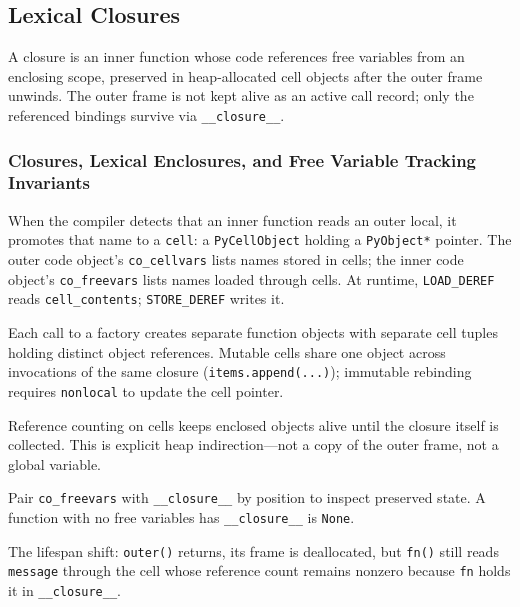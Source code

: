 \subsection{Lexical Closures}

A closure is an inner function whose code references free variables from an enclosing scope, preserved in heap-allocated cell objects after the outer frame unwinds. The outer frame is not kept alive as an active call record; only the referenced bindings survive via \texttt{\_\_closure\_\_}.

\subsubsection{Closures, Lexical Enclosures, and Free Variable Tracking Invariants}

When the compiler detects that an inner function reads an outer local, it promotes that name to a \texttt{cell}: a \texttt{PyCellObject} holding a \texttt{PyObject*} pointer. The outer code object's \texttt{co\_cellvars} lists names stored in cells; the inner code object's \texttt{co\_freevars} lists names loaded through cells. At runtime, \texttt{LOAD\_DEREF} reads \texttt{cell\_contents}; \texttt{STORE\_DEREF} writes it.



Each call to a factory creates separate function objects with separate cell tuples holding distinct object references. Mutable cells share one object across invocations of the same closure (\texttt{items.append(...)}); immutable rebinding requires \texttt{nonlocal} to update the cell pointer.

Reference counting on cells keeps enclosed objects alive until the closure itself is collected. This is explicit heap indirection---not a copy of the outer frame, not a global variable.

Pair \texttt{co\_freevars} with \texttt{\_\_closure\_\_} by position to inspect preserved state. A function with no free variables has \texttt{\_\_closure\_\_} is \texttt{None}.

The lifespan shift: \texttt{outer()} returns, its frame is deallocated, but \texttt{fn()} still reads \texttt{message} through the cell whose reference count remains nonzero because \texttt{fn} holds it in \texttt{\_\_closure\_\_}.
